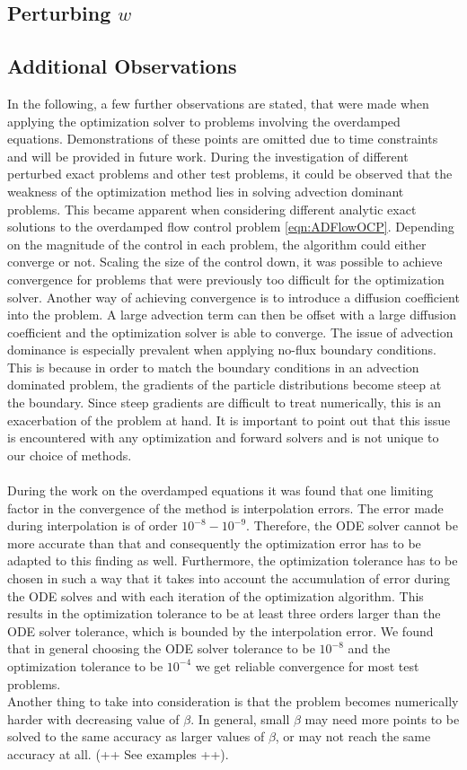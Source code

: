 \documentclass[11pt, a4paper]{article}
\theoremstyle{definition}
\begin{document}
\subsection{Perturbing $w$}

\subsection{Additional Observations}
In the following, a few further observations are stated, that were made when applying the optimization solver to problems involving the overdamped equations. Demonstrations of these points are omitted due to time constraints and will be provided in future work.
During the investigation of different perturbed exact problems and other test problems, it could be observed that the weakness of the optimization method lies in solving advection dominant problems. 
This became apparent when considering different analytic exact solutions to the overdamped flow control problem \eqref{eqn:ADFlowOCP}. Depending on the magnitude of the control in each problem, the algorithm could either converge or not. Scaling the size of the control down, it was possible to achieve convergence for problems that were previously too difficult for the optimization solver. Another way of achieving convergence is to introduce a diffusion coefficient into the problem. A large advection term can then be offset with a large diffusion coefficient and the optimization solver is able to converge.
The issue of advection dominance is especially prevalent when applying no-flux boundary conditions. This is because in order to match the boundary conditions in an advection dominated problem, the gradients of the particle distributions become steep at the boundary. Since steep gradients are difficult to treat numerically, this is an exacerbation of the problem at hand.
It is important to point out that this issue is encountered with any optimization and forward solvers and is not unique to our choice of methods. 
\\
\\
During the work on the overdamped equations it was found that one limiting factor in the convergence of the method is interpolation errors. The error made during interpolation is of order $10^{-8} - 10^{-9}$. Therefore, the ODE solver cannot be more accurate than that and consequently the optimization error has to be adapted to this finding as well.
Furthermore, the optimization tolerance has to be chosen in such a way that it takes into account the accumulation of error during the ODE solves and with each iteration of the optimization algorithm. This results in the optimization tolerance to be at least three orders larger than the ODE solver tolerance, which is bounded by the interpolation error. We found that in general choosing the ODE solver tolerance to be $10^{-8}$ and the optimization tolerance to be $10^{-4}$ we get reliable convergence for most test problems.
\\
Another thing to take into consideration is that the problem becomes numerically harder with decreasing value of $\beta$. In general, small $\beta$ may need more points to be solved to the same accuracy as larger values of $\beta$, or may not reach the same accuracy at all. (++ See examples ++).
\end{document}
